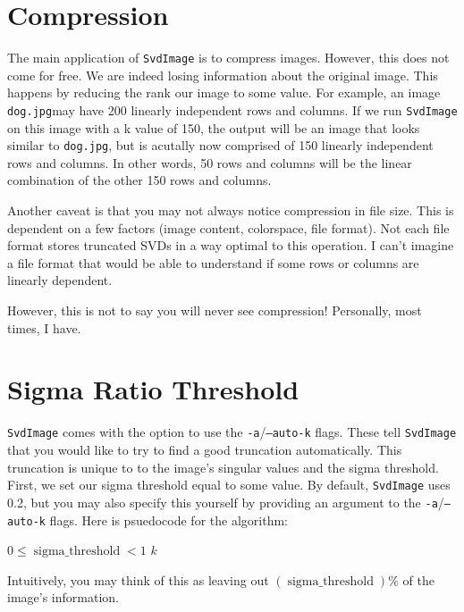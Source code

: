 \documentclass[12pt,letterpaper]{article}
\newcommand{\svdimage}{\texttt{SvdImage} }
\begin{document}
\section{Compression}
The main application of \svdimage is to compress images. However, this does not
come for free. We are indeed losing information about the original image. This
happens by reducing the rank our image to some value. For example, an image
\texttt{dog.jpg}may have 200 linearly independent rows and columns. If we run
\svdimage on this image with a k value of 150, the output will be an image that
looks similar to \texttt{dog.jpg}, but is acutally now comprised of 150 linearly
independent rows and columns. In other words, 50 rows and columns will be the
linear combination of the other 150 rows and columns. 

Another caveat is that you may not always notice compression in file size. This
is dependent on a few factors (image content, colorspace, file format). Not each
file format stores truncated SVDs in a way optimal to this operation. I can't
imagine a file format that would be able to understand if some rows or columns
are linearly dependent.

However, this is not to say you will never see compression! Personally, most
times, I have.

\section{Sigma Ratio Threshold}
\svdimage comes with the option to use the \texttt{-a}/\texttt{--auto-k} flags.
These tell \svdimage that you would like to try to find a good truncation
automatically. This truncation is unique to to the image's singular values and
the sigma threshold. First, we set our sigma threshold equal to some value. By
default, \svdimage uses 0.2, but you may also specify this yourself by providing
an argument to the \texttt{-a}/\texttt{--auto-k} flags. Here is psuedocode for
the algorithm:

\begin{algorithmic}
  \Require $0 \leq \operatorname{sigma\_threshold} < 1$
      \Return $k$
    \EndIf
  \EndFor
\end{algorithmic}

Intuitively, you may think of this as leaving out
$(\operatorname{sigma\_threshold})\%$ of the image's information.
\end{document}

